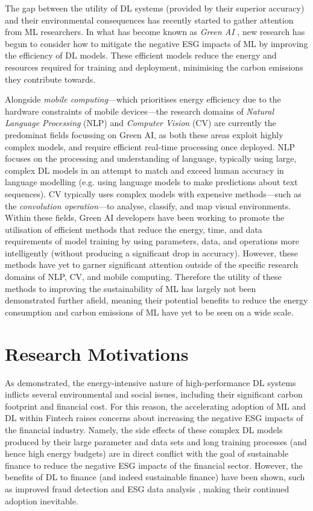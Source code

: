 \documentclass[a4paper, 11pt]{report}
\begin{document}
    The gap between the utility of DL systems (provided by their superior accuracy) and their environmental consequences has recently started to gather attention from ML researchers. In what has become known as \emph{Green AI} \citep{schwartz-2019}, new research has begun to consider how to mitigate the negative ESG impacts of ML by improving the efficiency of DL models. These efficient models reduce the energy and resources required for training and deployment, minimising the carbon emissions they contribute towards. 

    Alongside \emph{mobile computing}---which prioritises energy efficiency due to the hardware constraints of mobile devices---the research domains of \emph{Natural Language Processing} (NLP) and \emph{Computer Vision} (CV) are currently the predominat fields focussing on Green AI, as both these areas exploit highly complex models, and require efficient real-time processing once deployed. NLP focuses on the processing and understanding of language, typically using large, complex DL models in an attempt to match and exceed human accuracy in language modelling (e.g. using language models to make predictions about text sequences). CV typically uses complex models with expensive methods---such as the \emph{convolution operation}---to analyse, classify, and map visual environments. Within these fields, Green AI developers have been working to promote the utilisation of efficient methods that reduce the energy, time, and data requirements of model training by using parameters, data, and operations more intelligently (without producing a significant drop in accuracy). However, these methods have yet to garner significant attention outside of the specific research domains of NLP, CV, and mobile computing. Therefore the utility of these methods to improving the sustainability of ML has largely not been demonstrated further afield, meaning their potential benefits to reduce the energy consumption and carbon emissions of ML have yet to be seen on a wide scale.


    \section{Research Motivations}
    \label{section: motivations}

    As demonstrated, the energy-intensive nature of high-performance DL systems inflicts several environmental and social issues, including their significant carbon footprint and financial cost. For this reason, the accelerating adoption of ML and DL within Fintech raises concerns about increasing the negative ESG impacts of the financial industry. Namely, the side effects of these complex DL models produced by their large parameter and data sets and long training processes (and hence high energy budgets) are in direct conflict with the goal of sustainable finance to reduce the negative ESG impacts of the financial sector. However, the benefits of DL to finance (and indeed sustainable finance) have been shown, such as improved fraud detection \citep{sadgali-2019} and ESG data analysis \citep{mehra-2022}, making their continued adoption inevitable. 
\end{document}
